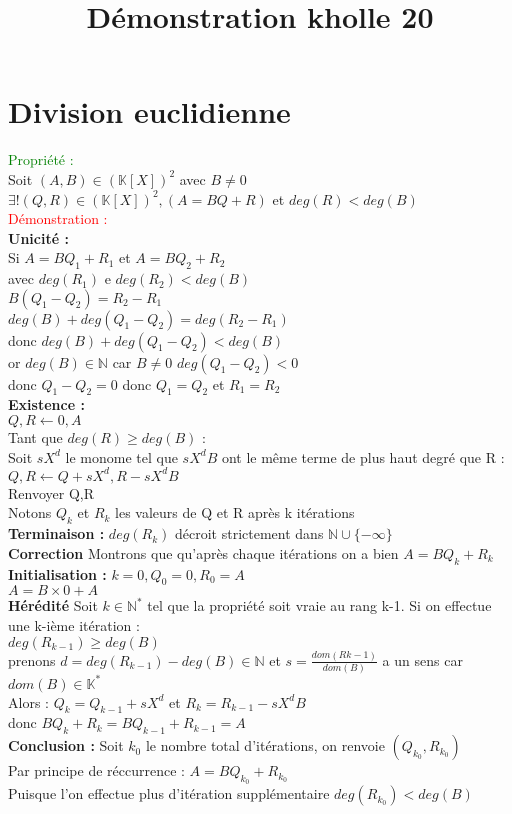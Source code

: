 \documentclass{article}
\begin{document}
\title{Démonstration kholle 20}
\date{}
\maketitle
	\renewcommand{\thesection}{\Roman{section}}
	\setlength{\parindent}{1.5cm}
\section{Division euclidienne}
\textcolor{green}{Propriété : } \\
Soit $(A,B) \in (\mathbb K [X])^2$ avec $B \neq 0$ \\
$\exists ! (Q,R) \in (\mathbb K [X])^2, (A=BQ+R)$ et $deg(R) < deg(B)$ \\
\textcolor{red}{Démonstration :} \\
{\bf Unicité :} \\
Si $A = BQ_1+R_1$ et $A=BQ_2 +R_2$ \\
avec $deg(R_1)$ e $deg(R_2)< deg (B)$ \\
$B(Q_1-Q_2)=R_2-R_1$ \\
$deg(B) +deg(Q_1-Q_2)=deg(R_2-R_1) $ \\
donc $deg(B)+deg(Q_1-Q_2)<deg(B)$ \\
or $deg(B) \in \mathbb N$ car $B  \neq 0$ $deg(Q_1-Q_2)<0$ \\
donc $Q_1-Q_2=0$ donc $Q_1=Q_2$ et $R_1=R_2$ \\
{\bf Existence :} \\
$Q,R \leftarrow 0,A$ \\
Tant que $deg(R) \geq deg(B)$ : \\
\indent Soit $sX^d$ le monome tel que $sX^dB$ ont le même terme de plus haut degré que R : \\
\indent $Q,R \leftarrow Q+sX^d,R-sX^dB$ \\
Renvoyer Q,R \\
Notons $Q_k$ et $R_k$ les valeurs de Q et R après k itérations \\
{\bf Terminaison :} $deg(R_k)$ décroit strictement dans $\mathbb N \cup \lbrace - \infty \rbrace$ \\
{\bf Correction} Montrons que qu'après chaque itérations on a bien $A=BQ_k+R_k$ \\
{\bf Initialisation :} $k=0, Q_0=0, R_0=A$ \\
$A=B \times 0 +A$ \\
{\bf Hérédité} Soit $ k \in \mathbb N^*$ tel que la propriété soit vraie au rang k-1. Si on effectue une k-ième itération : \\
$deg(R_{k-1}) \geq deg(B)$ \\
prenons $d=deg(R_{k-1}) -deg(B) \in \mathbb N$ et $s= \frac{dom(R{k-1})}{dom(B)}$ a un sens car $dom(B) \in \mathbb K ^*$ \\
Alors : $Q_k =Q_{k-1} + s X^d$ et $R_k=R_{k-1} -s X^dB$ \\
donc $B Q_k +R_k =B Q_{k-1} +R_{k-1} =A$ \\
{\bf Conclusion :} Soit $k_0$ le nombre total d'itérations, on renvoie $(Q_{k_0},R_{k_0})$ \\
Par principe de réccurrence : $A=BQ_{k_0} + R_{k_0}$ \\
Puisque l'on effectue plus d'itération supplémentaire $deg(R_{k_0}) < deg(B)$
\end{document}
